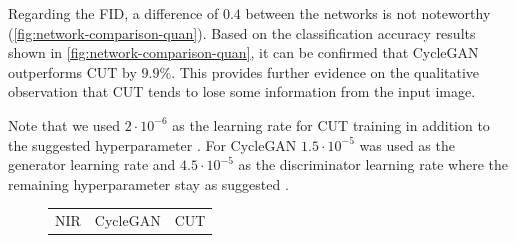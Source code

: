 \documentclass[a4paper,11pt, DIV=12]{scrartcl}
\begin{document}
Regarding the FID, a difference of $0.4$ between the networks is not noteworthy (\autoref{fig:network-comparison-quan}).
Based on the classification accuracy results shown in \autoref{fig:network-comparison-quan}, it can be confirmed that CycleGAN outperforms CUT by $9.9\%$.
This provides further evidence on the qualitative observation that CUT tends to lose some information from the input image.

Note that we used $2\cdot10^{-6}$ as the learning rate for CUT training in addition to the suggested hyperparameter \cite{cut}.
For CycleGAN $1.5\cdot10^{-5}$ was used as the generator learning rate and $4.5\cdot10^{-5}$ as the discriminator learning rate where the remaining hyperparameter stay as suggested \cite{mehri2019colorizing}.

\begin{figure}[ht]
   \centering
   \begin{tabularx}{.69\textwidth}{>{\centering\arraybackslash}X >{\centering\arraybackslash}X >{\centering\arraybackslash}X}
      NIR \cite{serengeti}                          & CycleGAN                                          & CUT                                          \\

\end{tabularx}
\end{figure}
\end{document}
